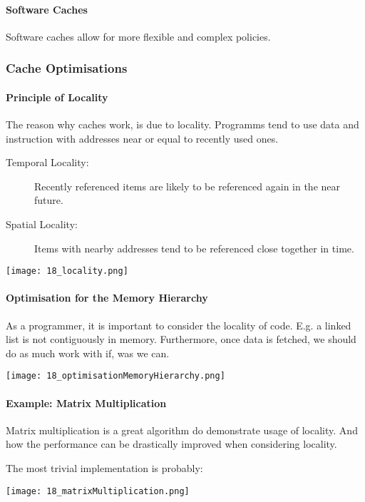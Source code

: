 \paragraph{Software Caches}
Software caches allow for more flexible and complex policies.

\subsubsection{Cache Optimisations}

\paragraph{Principle of Locality}
The reason why caches work, is due to locality. Programms tend to use data and instruction with addresses near or equal to recently used ones.

\begin{description}
    \item[Temporal Locality:] Recently referenced items are likely to be referenced again in the near future.
    \item[Spatial Locality:] Items with nearby addresses tend to be referenced close together in time.
\end{description}

\texttt{[image: 18\_locality.png]}

\paragraph{Optimisation for the Memory Hierarchy}
As a programmer, it is important to consider the locality of code. E.g. a linked list is not contiguously in memory. Furthermore, once data is fetched, we should do as much work with if, was we can.

\texttt{[image: 18\_optimisationMemoryHierarchy.png]}

\paragraph{Example: Matrix Multiplication}
Matrix multiplication is a great algorithm do demonstrate usage of locality. And how the performance can be drastically improved when considering locality.

The most trivial implementation is probably:

\texttt{[image: 18\_matrixMultiplication.png]}

